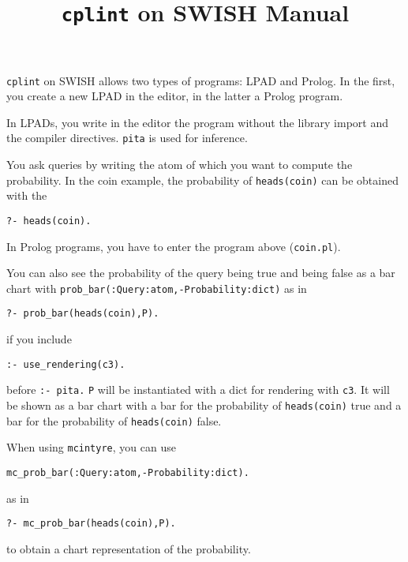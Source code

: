 \documentclass[a4paper,10pt]{scrartcl}
\begin{document}
\title{\texttt{cplint} on SWISH Manual}
\maketitle

%





\verb|cplint| on SWISH allows two types of programs: LPAD and Prolog. In the first, you create a new LPAD in the editor, in the latter a Prolog program. 

In LPADs, you write in the editor the program without the library import and the compiler directives. \verb|pita| is used for inference.

You ask queries by writing the atom of which you want to compute the probability. In the coin example, the probability of \verb|heads(coin)| can be obtained with the 
\begin{verbatim}
?- heads(coin).
\end{verbatim}

In Prolog programs, you have to enter the program above (\verb|coin.pl|).




You can also see the probability of the query being true and 
being false as a bar chart with \verb|prob_bar(:Query:atom,-Probability:dict)| as in
\begin{verbatim}
?- prob_bar(heads(coin),P).
\end{verbatim}
if you include
\begin{verbatim}
:- use_rendering(c3).
\end{verbatim}
before \verb|:- pita.| \verb|P| will be instantiated with a
dict for rendering with \verb|c3|. It will be shown as a bar chart with
a bar for the probability of \verb|heads(coin)| true and a bar for the probability of \verb|heads(coin)| false.


When using \verb|mcintyre|, you can use
\begin{verbatim}
mc_prob_bar(:Query:atom,-Probability:dict).
\end{verbatim}
as in
\begin{verbatim}
?- mc_prob_bar(heads(coin),P).
\end{verbatim}
to obtain a chart representation of the probability.
\end{document}
